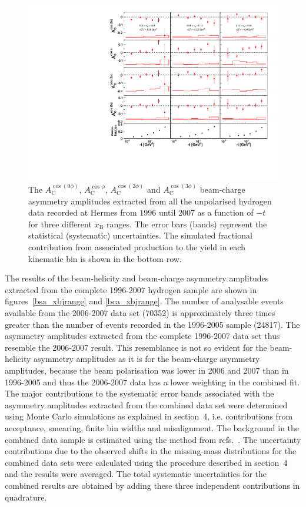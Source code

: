 \documentclass[11pt,a4paper]{article}
\begin{document}
\begin{figure}
  \begin{center}
    \includegraphics[width=15cm]{bca_2D}
    \caption{The $A_{\textrm{C}}^{\cos(0\phi)}$, $A_{\textrm{C}}^{\cos\phi}$, $A_{\textrm{C}}^{\cos(2\phi)}$ and $A_{\textrm{C}}^{\cos(3\phi)}$ beam-charge asymmetry amplitudes extracted from all the unpolarised hydrogen data recorded at H{\sc ermes} from 1996 until 2007 as a function of $-t$ for three different $x_{\textrm{B}}$ ranges. The error bars (bands) represent the statistical (systematic) uncertainties. The simulated fractional contribution from associated production to the yield in each kinematic bin is shown in the bottom row.}
  \label{bca_xbjrange2}
 \end{center}
\end{figure}

The results of the beam-helicity and beam-charge asymmetry amplitudes extracted from the complete 1996-2007 hydrogen sample are shown in figures~\ref{bsa_xbjrange} and \ref{bca_xbjrange}. The number of analysable events available from the 2006-2007 data set (70352) is approximately three times greater than the number of events recorded in the 1996-2005 sample (24817). The  asymmetry amplitudes extracted from the complete 1996-2007 data set thus resemble the 2006-2007 result. This resemblance is not so evident for the beam-helicity asymmetry amplitudes as it is for the beam-charge asymmetry amplitudes, because the beam polarisation was lower in 2006 and 2007 than in 1996-2005 and thus the 2006-2007 data has a lower weighting in the combined fit. The major contributions to the systematic error bands associated with the asymmetry amplitudes extracted from the combined data set were determined using Monte Carlo simulations as explained in section~4, i.e. contributions from acceptance, smearing, finite bin widths and misalignment. The background in the combined data sample is estimated using the method from refs.~\cite{Air08,Zei09, Bur10}. The uncertainty contributions due to the observed shifts in the missing-mass distributions for the combined data sets were calculated using the procedure described in section~4 and the results were averaged. The total systematic uncertainties for the combined results are obtained by adding these three independent contributions in quadrature.
\end{document}
